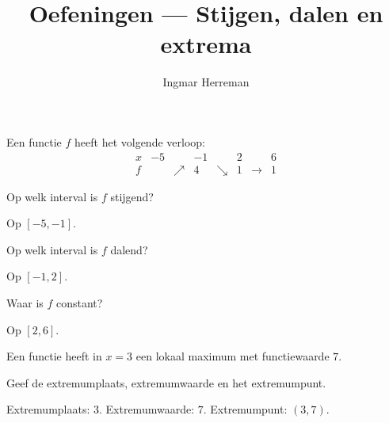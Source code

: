 \documentclass{ximera}
\title{Oefeningen — Stijgen, dalen en extrema}
\author{Ingmar Herreman}
\begin{document}





\maketitle
\FVDbeginExercises


\begin{oefening}{\oefB\ESS}

Een functie \(f\) heeft het volgende verloop:
\[
\begin{array}{c|ccccccc}
x&-5&&-1&&2&&6\\ \hline
f&&\nearrow&4&\searrow&1&\longrightarrow&1
\end{array}
\]

\begin{question}
Op welk interval is \(f\) stijgend?
\begin{oplossing}
Op \([-5,-1]\).
\end{oplossing}
\end{question}

\begin{question}
Op welk interval is \(f\) dalend?
\begin{oplossing}
Op \([-1,2]\).
\end{oplossing}
\end{question}

\begin{question}
Waar is \(f\) constant?
\begin{oplossing}
Op \([2,6]\).
\end{oplossing}
\end{question}
\end{oefening}

\begin{oefening}{\oefB\ESS}

Een functie heeft in \(x=3\) een lokaal maximum met functiewaarde \(7\).

\begin{question}
Geef de extremumplaats, extremumwaarde en het extremumpunt.
\begin{oplossing}
Extremumplaats: \(3\). Extremumwaarde: \(7\).
Extremumpunt: \((3,7)\).
\end{oplossing}
\end{question}
\end{oefening}
\end{document}
